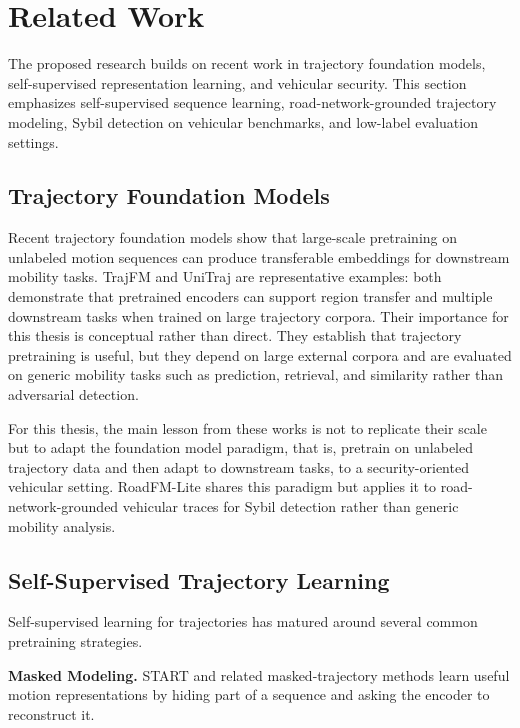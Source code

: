 \documentclass[12pt]{article}
\begin{document}
\section{Related Work}\label{sec:relatedwork}

The proposed research builds on recent work in trajectory foundation models, self-supervised representation learning, and vehicular security. This section emphasizes self-supervised sequence learning, road-network-grounded trajectory modeling, Sybil detection on vehicular benchmarks, and low-label evaluation settings.

\subsection{Trajectory Foundation Models}

Recent trajectory foundation models show that large-scale pretraining on unlabeled motion sequences can produce transferable embeddings for downstream mobility tasks. TrajFM \cite{lin2024trajfm} and UniTraj \cite{liang2025unitraj} are representative examples: both demonstrate that pretrained encoders can support region transfer and multiple downstream tasks when trained on large trajectory corpora. Their importance for this thesis is conceptual rather than direct. They establish that trajectory pretraining is useful, but they depend on large external corpora and are evaluated on generic mobility tasks such as prediction, retrieval, and similarity rather than adversarial detection.

For this thesis, the main lesson from these works is not to replicate their scale but to adapt the foundation model paradigm, that is, pretrain on unlabeled trajectory data and then adapt to downstream tasks, to a security-oriented vehicular setting. RoadFM-Lite shares this paradigm but applies it to road-network-grounded vehicular traces for Sybil detection rather than generic mobility analysis.

\subsection{Self-Supervised Trajectory Learning}

Self-supervised learning for trajectories has matured around several common pretraining strategies.

\textbf{Masked Modeling.} START \cite{jiang2023start} and related masked-trajectory methods learn useful motion representations by hiding part of a sequence and asking the encoder to reconstruct it.
\end{document}
